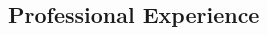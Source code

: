 \documentclass[margin,line, 12pt]{res}
\newenvironment{list2}{
  \begin{list}{$\bullet$}{%
      \setlength{\itemsep}{0.04in}
      \setlength{\parsep}{0.00in} \setlength{\parskip}{0in}
      \setlength{\topsep}{0.0in} \setlength{\partopsep}{0in}
      \setlength{\leftmargin}{0.2in}}}{\end{list}}
\begin{document}
\begin{spacing}{0.98}
\begin{resume}
\section{Professional \newline Experience}
%

\end{resume}
\end{spacing}
\end{document}
